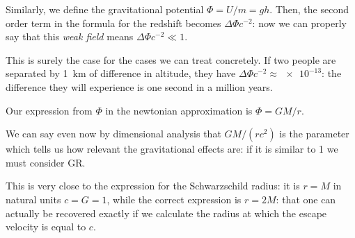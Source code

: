\documentclass[main.tex]{subfiles}
\begin{document}
Similarly, we define the gravitational potential \(\Phi = U/m = gh\).
Then, the second order term in the formula for the redshift becomes \(\Delta \Phi c^{-2}\): now we can properly say that this \emph{weak field} means \(\Delta \Phi c^{-2} \ll 1\).

This is surely the case for the cases we can treat concretely.
If two people are separated by \SI{1}{km} of difference in altitude, they have \(\Delta \Phi c^{-2} \approx \num{e-13} \): the difference they will experience is one second in a million years.

Our expression from \(\Phi \) in the newtonian approximation is \(\Phi = GM /r\).

We can say even now by dimensional analysis that \(GM / (rc^2)\) is the parameter which tells us how relevant the gravitational effects are: if it is similar to 1 we must consider GR.

This is very close to the expression for the Schwarzschild radius: it is \(r=M\) in natural units \(c=G=1\), while the correct expression is \(r= 2M\): that one can actually be recovered exactly if we calculate the radius at which the escape velocity is equal to \(c\).
\end{document}
